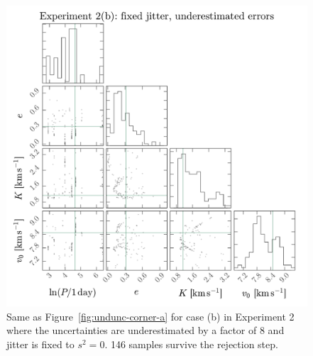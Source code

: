 \documentclass[manuscript, letterpaper]{aastex6}
\newcommand{\figname}{Figure}
\begin{document}
\begin{figure}[p]
\begin{center}
\includegraphics[width=\textwidth]{figures/undunc-corner-b.pdf}
\end{center}
\caption{%
Same as \figname~\ref{fig:undunc-corner-a} for case (b) in Experiment 2 where the
uncertainties are underestimated by a factor of 8 and jitter is fixed to
$s^2 = 0$.
146 samples survive the rejection step.
\label{fig:undunc-corner-b}}
\end{figure}
\end{document}
